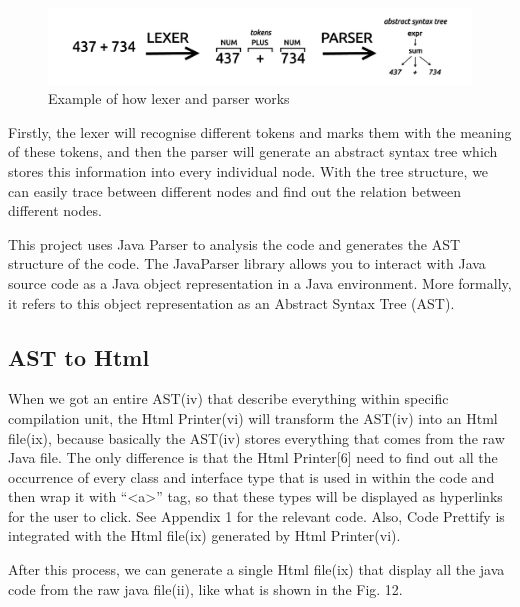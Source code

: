 \documentclass[runningheads]{llncs}
\begin{document}
\begin{figure}[H]
	\centering
	\includegraphics[width=12cm]{pic/AST-Example.png}
	\caption{Example of how lexer and parser works\cite{parsing-in-java}}
	\label{Example of how lexer and parser works}
\end{figure}

Firstly, the lexer will recognise different tokens and marks them with the meaning of these tokens, and then the parser will generate an abstract syntax tree which stores this information into every individual node. With the tree structure, we can easily trace between different nodes and find out the relation between different nodes.

This project uses Java Parser to analysis the code and generates the AST structure of the code. The JavaParser library allows you to interact with Java source code as a Java
object representation in a Java environment. More formally, it refers to this object representation as an Abstract Syntax Tree (AST).\cite{smith_javaparser:_2016}

\subsection{AST to Html}

When we got an entire AST(iv) that describe everything within specific compilation unit, the Html Printer(vi) will transform the AST(iv) into an Html file(ix), because basically the AST\cite{AST_introduction}(iv)  stores everything that comes from the raw Java file. The only difference is that the Html Printer[6] need to find out all the occurrence of every class and interface type that is used in within the code and then wrap it with “<a>” tag, so that these types will be displayed as hyperlinks for the user to click. See Appendix 1 for the relevant code. Also, Code Prettify\cite{code-prettify} is integrated with the Html file(ix)  generated by Html Printer(vi).

After this process, we can generate a single Html file(ix) that display all the java code from the raw java file(ii), like what is shown in the Fig. 12.
\end{document}
